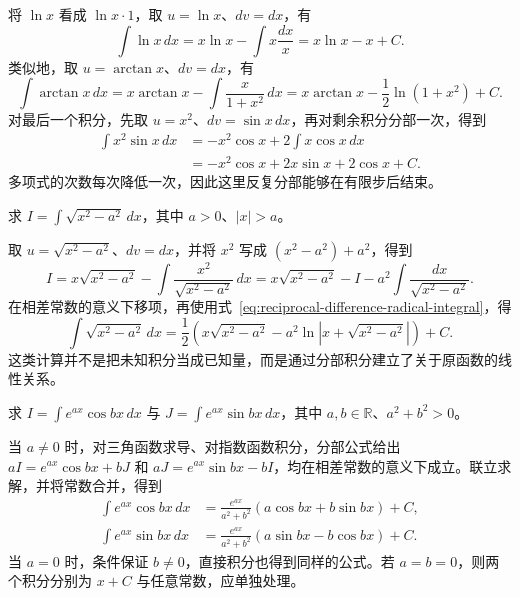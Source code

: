 \begin{solve}
将 $\ln x$ 看成 $\ln x\cdot1$，取 $u=\ln x$、$dv=dx$，有
\[
    \int\ln x\,dx=x\ln x-\int x\frac{dx}{x}
       =x\ln x-x+C.
\]
类似地，取 $u=\arctan x$、$dv=dx$，有
\[
    \int\arctan x\,dx
       =x\arctan x-\int\frac{x}{1+x^2}\,dx
       =x\arctan x-\frac12\ln(1+x^2)+C.
\]
对最后一个积分，先取 $u=x^2$、$dv=\sin x\,dx$，再对剩余积分分部一次，得到
\begin{align*}
    \int x^2\sin x\,dx
       &=-x^2\cos x+2\int x\cos x\,dx\\
       &=-x^2\cos x+2x\sin x+2\cos x+C.
\end{align*}
多项式的次数每次降低一次，因此这里反复分部能够在有限步后结束。
\end{solve}

\begin{example}
\label{ex:integration-by-parts-radical}
求 $\displaystyle I=\int\sqrt{x^2-a^2}\,dx$，其中 $a>0$、$|x|>a$。
\end{example}

\begin{solve}
取 $u=\sqrt{x^2-a^2}$、$dv=dx$，并将 $x^2$ 写成 $(x^2-a^2)+a^2$，得到
\[
    I=x\sqrt{x^2-a^2}-\int\frac{x^2}{\sqrt{x^2-a^2}}\,dx
      =x\sqrt{x^2-a^2}-I-a^2\int\frac{dx}{\sqrt{x^2-a^2}}.
\]
在相差常数的意义下移项，再使用式~\eqref{eq:reciprocal-difference-radical-integral}，得
\begin{equation}
    \int\sqrt{x^2-a^2}\,dx
      =\frac12\left(x\sqrt{x^2-a^2}
             -a^2\ln|x+\sqrt{x^2-a^2}|\right)+C.
    \label{eq:difference-radical-integral}
\end{equation}
这类计算并不是把未知积分当成已知量，而是通过分部积分建立了关于原函数的线性关系。
\end{solve}

\begin{example}
\label{ex:cyclic-exponential-trigonometric-integrals}
求 $\displaystyle I=\int e^{ax}\cos bx\,dx$ 与 $\displaystyle J=\int e^{ax}\sin bx\,dx$，其中 $a,b\in\mathbb{R}$、$a^2+b^2>0$。
\end{example}

\begin{solve}
当 $a\neq0$ 时，对三角函数求导、对指数函数积分，分部公式给出 $aI=e^{ax}\cos bx+bJ$ 和 $aJ=e^{ax}\sin bx-bI$，均在相差常数的意义下成立。联立求解，并将常数合并，得到
\begin{align}
    \int e^{ax}\cos bx\,dx
      &=\frac{e^{ax}}{a^2+b^2}(a\cos bx+b\sin bx)+C,
        \label{eq:exponential-cosine-integral}\\
    \int e^{ax}\sin bx\,dx
      &=\frac{e^{ax}}{a^2+b^2}(a\sin bx-b\cos bx)+C.
        \label{eq:exponential-sine-integral}
\end{align}
当 $a=0$ 时，条件保证 $b\neq0$，直接积分也得到同样的公式。若 $a=b=0$，则两个积分分别为 $x+C$ 与任意常数，应单独处理。
\end{solve}

